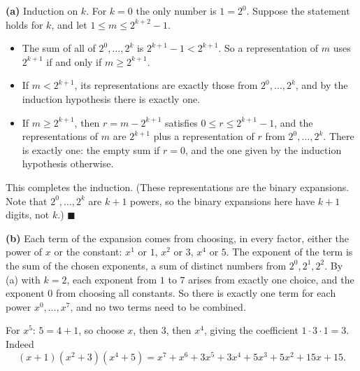 \textbf{(a)} Induction on $k$. For $k=0$ the only number is $1=2^0$. Suppose the statement holds for $k$, and let $1\le m\le2^{k+2}-1$.
\begin{itemize}
\item The sum of all of $2^0,\dots,2^k$ is $2^{k+1}-1<2^{k+1}$. So a representation of $m$ uses $2^{k+1}$ if and only if $m\ge2^{k+1}$.
\item If $m<2^{k+1}$, its representations are exactly those from $2^0,\dots,2^k$, and by the induction hypothesis there is exactly one.
\item If $m\ge2^{k+1}$, then $r=m-2^{k+1}$ satisfies $0\le r\le2^{k+1}-1$, and the representations of $m$ are $2^{k+1}$ plus a representation of $r$ from $2^0,\dots,2^k$. There is exactly one: the empty sum if $r=0$, and the one given by the induction hypothesis otherwise.
\end{itemize}
This completes the induction. (These representations are the binary expansions. Note that $2^0,\dots,2^k$ are $k+1$ powers, so the binary expansions here have $k+1$ digits, not $k$.) $\blacksquare$

\textbf{(b)} Each term of the expansion comes from choosing, in every factor, either the power of $x$ or the constant: $x^1$ or $1$, $x^2$ or $3$, $x^4$ or $5$. The exponent of the term is the sum of the chosen exponents, a sum of distinct numbers from $2^0,2^1,2^2$. By (a) with $k=2$, each exponent from $1$ to $7$ arises from exactly one choice, and the exponent $0$ from choosing all constants. So there is exactly one term for each power $x^0,\dots,x^7$, and no two terms need to be combined.

For $x^5$: $5=4+1$, so choose $x$, then $3$, then $x^4$, giving the coefficient $1\cdot3\cdot1=\boxed{3}$. Indeed
\[(x+1)\left(x^2+3\right)\left(x^4+5\right)=x^7+x^6+3x^5+3x^4+5x^3+5x^2+15x+15.\]
